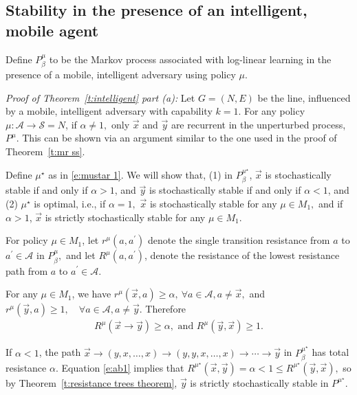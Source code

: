 \subsection{Stability in the presence of an intelligent, mobile agent}\label{a:intelligent proof}

Define $P^\mu_\beta$ to be the Markov process associated with log-linear learning in the presence of a mobile, intelligent adversary using policy $\mu.$

\noindent\emph{Proof of Theorem~\ref{t:intelligent} part (a):}
Let $G = (N,E)$ be the line, influenced by a mobile, intelligent adversary with capability $k = 1.$ For any policy $\mu:\mathcal{A}\to\mathcal{S} = N$, if $\alpha \neq 1,$ only $\vec{x}$ and $ \vec{y}$ are recurrent in the unperturbed process, $P^\mu$. This can be shown via an argument similar to the one used in the proof of Theorem~\ref{t:mr ss}. 

Define $\mu^\star$ as in \eqref{e:mustar 1}. We will show that, (1) in $P^{\mu^\star}_\beta$, $\vec{x}$ is stochastically stable if and only if $\alpha >1$, and $ \vec{y}$ is stochastically stable if and only if $\alpha<1$, and (2) $\mu^\star$ is optimal, i.e., if $\alpha = 1,$ $\vec{x}$ is stochastically stable for any $\mu\in M_1,$ and if $\alpha >1$, $\vec{x}$ is strictly stochastically stable for any $\mu\in M_1.$

For policy $\mu\in M_1$, let $r^{\mu}(a,a^\prime)$ denote the single transition resistance from $a$ to $a^\prime\in \mathcal{A}$ in $P^\mu_\beta,$ and let $R^\mu(a,a^\prime)$, denote the resistance of the lowest resistance path from $a$ to $a^\prime\in \mathcal{A}$. 

For any $\mu\in M_1$, we have
$r^\mu(\vec{x}, a)\geq \alpha,\ \forall a\in\mathcal{A},a\neq \vec{x},$ and
$r^\mu( \vec{y}, a) \geq 1,\quad\forall a\in\mathcal{A}, a\neq  \vec{y}.$
Therefore
\begin{align}
R^\mu(\vec{x}\to \vec{y})\geq\alpha,\text{ and }R^\mu ( \vec{y},\vec{x})\geq 1\label{e:ab1}.%
\end{align}

If $\alpha <1$, the path
$\vec{x}\to(y,x,\ldots,x)\to (y,y,x,\ldots,x)\to\cdots\to  \vec{y}$
in $P^{\mu^\star}_\beta$ has total resistance $\alpha$. Equation \eqref{e:ab1} implies that
$R^{\mu^\star}(\vec{x}, \vec{y})  = \alpha < 1 \leq R^{\mu^\star}( \vec{y},\vec{x}),$
so by Theorem~\ref{t:resistance trees theorem}, $ \vec{y}$ is strictly stochastically stable in $P^{\mu^\star}.$

